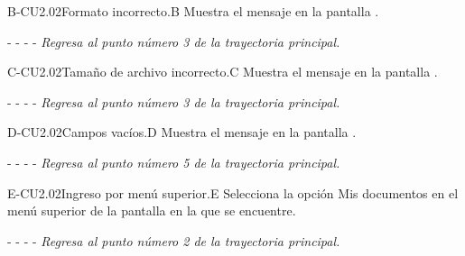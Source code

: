 	
	\begin{UCtrayectoriaA}{B-CU2.02}{Formato incorrecto.}{B}
	    \UCpaso[\UCsist]Muestra el mensaje  en la pantalla .
	    \item[- -] - - {\em Regresa al punto número 3 de la trayectoria principal.}
	\end{UCtrayectoriaA}

	\begin{UCtrayectoriaA}{C-CU2.02}{Tamaño de archivo incorrecto.}{C}
	    \UCpaso[\UCsist]Muestra el mensaje  en la pantalla .
	    \item[- -] - - {\em Regresa al punto número 3 de la trayectoria principal.}
	\end{UCtrayectoriaA}
	
	\begin{UCtrayectoriaA}{D-CU2.02}{Campos vacíos.}{D}
	    \UCpaso[\UCsist]Muestra el mensaje en la pantalla .
	    \item[- -] - - {\em Regresa al punto número 5 de la trayectoria principal.}
	\end{UCtrayectoriaA}
	\begin{UCtrayectoriaA}{E-CU2.02}{Ingreso por menú superior.}{E}
	    \UCpaso[\UCactor] Selecciona la opción Mis documentos en el menú superior de la pantalla en la que se encuentre.
	
	    \item[- -] - - {\em Regresa al punto número 2 de la trayectoria principal.}
	\end{UCtrayectoriaA}
	

